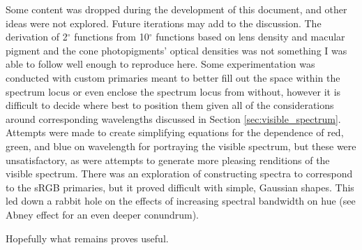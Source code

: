 \documentclass{article}
\begin{document}
\begin{multicols}{2}
Some content was dropped during the development of this document, and other ideas were not explored.  Future iterations may add to the discussion.  The derivation of 2$^\circ$ functions from 10$^\circ$ functions based on lens density and macular pigment and the cone photopigments' optical densities was not something I was able to follow well enough to reproduce here.  Some experimentation was conducted with custom primaries meant to better fill out the space within the spectrum locus or even enclose the spectrum locus from without, however it is difficult to decide where best to position them given all of the considerations around corresponding wavelengths discussed in Section \ref{sec:visible_spectrum}.  Attempts were made to create simplifying equations for the dependence of red, green, and blue on wavelength for portraying the visible spectrum, but these were unsatisfactory, as were attempts to generate more pleasing renditions of the visible spectrum.  There was an exploration of constructing spectra to correspond to the sRGB primaries, but it proved difficult with simple, Gaussian shapes.  This led down a rabbit hole on the effects of increasing spectral bandwidth on hue (see Abney effect for an even deeper conundrum).

Hopefully what remains proves useful.


\printbibliography

\end{multicols}
\end{document}
